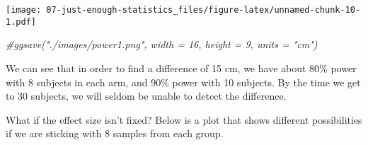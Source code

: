 \documentclass[
]{article}
\newenvironment{Shaded}{\begin{snugshade}}{\end{snugshade}}
\newcommand{\AttributeTok}[1]{\textcolor[rgb]{0.77,0.63,0.00}{#1}}
\newcommand{\CommentTok}[1]{\textcolor[rgb]{0.56,0.35,0.01}{\textit{#1}}}
\newcommand{\ControlFlowTok}[1]{\textcolor[rgb]{0.13,0.29,0.53}{\textbf{#1}}}
\newcommand{\DecValTok}[1]{\textcolor[rgb]{0.00,0.00,0.81}{#1}}
\newcommand{\FloatTok}[1]{\textcolor[rgb]{0.00,0.00,0.81}{#1}}
\newcommand{\FunctionTok}[1]{\textcolor[rgb]{0.00,0.00,0.00}{#1}}
\newcommand{\NormalTok}[1]{#1}
\newcommand{\OtherTok}[1]{\textcolor[rgb]{0.56,0.35,0.01}{#1}}
\newcommand{\SpecialCharTok}[1]{\textcolor[rgb]{0.00,0.00,0.00}{#1}}
\newcommand{\StringTok}[1]{\textcolor[rgb]{0.31,0.60,0.02}{#1}}
\begin{document}
\texttt{[image: 07-just-enough-statistics\_files/figure-latex/unnamed-chunk-10-1.pdf]}

\begin{Shaded}
\begin{Highlighting}[]
\CommentTok{\#ggsave("./images/power1.png", width = 16, height = 9, units = "cm")}
\end{Highlighting}
\end{Shaded}

We can see that in order to find a difference of 15 cm, we have about
80\% power with 8 subjects in each arm, and 90\% power with 10 subjects.
By the time we get to 30 subjects, we will seldom be unable to detect
the difference.

What if the effect size isn't fixed? Below is a plot that shows
different possibilities if we are sticking with 8 samples from each
group.

\begin{Shaded}
\end{Shaded}
\end{document}
